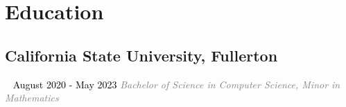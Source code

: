\documentclass{article}
\newcommand{\resumesection}[3]{
    \subsection*{#1}
    \ 
    \normalsize
    \normalsize
    \hfill
    \textcolor{black}{#3}
    \normalsize
    \newline
    \small
    \textcolor{grey}{\emph{#2}}
}
\begin{document}
\pagestyle{useheader}
\section*{Education}
\resumesection{California State University, Fullerton}{Bachelor of Science in Computer Science, Minor in Mathematics}{August 2020 - May 2023}
\end{document}
